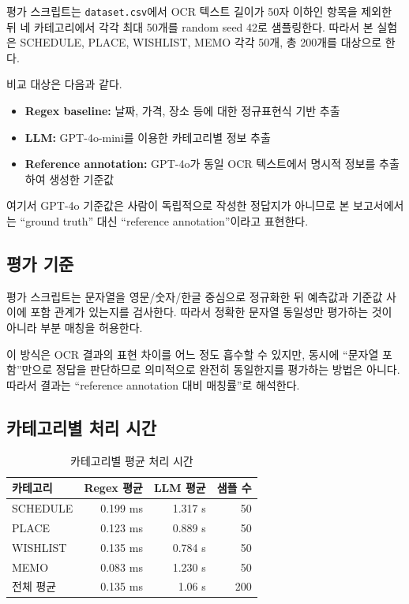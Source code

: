 \documentclass[11pt,a4paper]{article}
\begin{document}
평가 스크립트는 \texttt{dataset.csv}에서 OCR 텍스트 길이가 50자 이하인 항목을 제외한 뒤 네 카테고리에서 각각 최대 50개를 random seed 42로 샘플링한다. 따라서 본 실험은 SCHEDULE, PLACE, WISHLIST, MEMO 각각 50개, 총 200개를 대상으로 한다.

비교 대상은 다음과 같다.

\begin{itemize}
    \item \textbf{Regex baseline:} 날짜, 가격, 장소 등에 대한 정규표현식 기반 추출
    \item \textbf{LLM:} GPT-4o-mini를 이용한 카테고리별 정보 추출
    \item \textbf{Reference annotation:} GPT-4o가 동일 OCR 텍스트에서 명시적 정보를 추출하여 생성한 기준값
\end{itemize}

여기서 GPT-4o 기준값은 사람이 독립적으로 작성한 정답지가 아니므로 본 보고서에서는 ``ground truth'' 대신 ``reference annotation''이라고 표현한다.

\subsection{평가 기준}

평가 스크립트는 문자열을 영문/숫자/한글 중심으로 정규화한 뒤 예측값과 기준값 사이에 포함 관계가 있는지를 검사한다. 따라서 정확한 문자열 동일성만 평가하는 것이 아니라 부분 매칭을 허용한다.

이 방식은 OCR 결과의 표현 차이를 어느 정도 흡수할 수 있지만, 동시에 ``문자열 포함''만으로 정답을 판단하므로 의미적으로 완전히 동일한지를 평가하는 방법은 아니다. 따라서 결과는 ``reference annotation 대비 매칭률''로 해석한다.

\subsection{카테고리별 처리 시간}

\begin{table}[H]
\centering
\small
\begin{tabularx}{0.9\linewidth}{l r r r}
\toprule
\textbf{카테고리} & \textbf{Regex 평균} & \textbf{LLM 평균} & \textbf{샘플 수}\\
\midrule
SCHEDULE & 0.199 ms & 1.317 s & 50\\
PLACE & 0.123 ms & 0.889 s & 50\\
WISHLIST & 0.135 ms & 0.784 s & 50\\
MEMO & 0.083 ms & 1.230 s & 50\\
\midrule
전체 평균 & 0.135 ms & 1.06 s & 200\\
\bottomrule
\end{tabularx}
\caption{카테고리별 평균 처리 시간}
\end{table}
\end{document}

